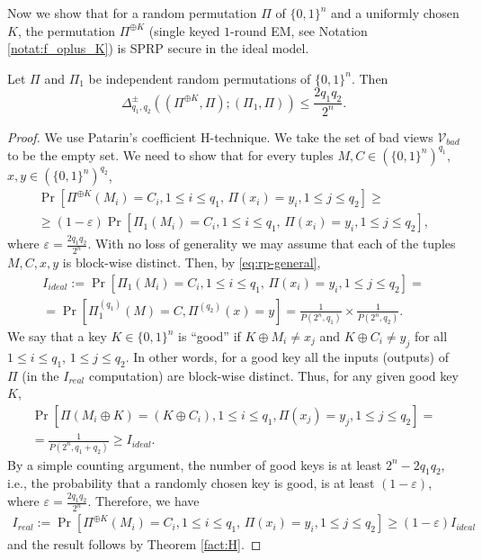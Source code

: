 \documentclass{llncs}
\newcommand{\s}{\{0,1\}}
\begin{document}
Now we show that for a random permutation $\Pi$ of $\s^n$ and a uniformly chosen $K$, the permutation $\Pi^{\oplus K}$ (single keyed $1$-round EM, see Notation \ref{notat:f_oplus_K}) is SPRP secure in the ideal model.
\begin{lemma}
\label{lemma2}
Let $\Pi$ and $\Pi_1$ be independent random permutations of $\s^n$. Then
\[\Delta^{\pm}_{q_1, q_2}\left((\Pi^{\oplus K}, \Pi);(\Pi_1, \Pi)\right) \leq  \frac{2q_1q_2}{2^n}.\]
\end{lemma}
\begin{proof} We use Patarin's coefficient H-technique. We take the set of bad views $\mathcal{V}_{bad}$ to be the empty set.
We need to show that for every tuples $M, C \in (\s^n)^{q_1}$, $x, y \in (\s^n)^{q_2}$,
\begin{gather*}
\Pr[\Pi^{\oplus K}(M_i) = C_i, 1 \leq i \leq q_1,\, \Pi(x_i) = y_i, 1 \leq j \leq q_2]\geq\\
\geq (1 - \varepsilon) \Pr[\Pi_1(M_i) = C_i, 1 \leq i \leq q_1,\, \Pi(x_i) = y_i, 1 \leq j \leq q_2],
\end{gather*}
where $\varepsilon=\frac{2q_1q_2}{2^n}$.
With no loss of generality we may assume that each of the tuples $M,C,x,y$ is block-wise distinct. Then, by \eqref{eq:rp-general},
\begin{gather*}I_{ideal} := \Pr[\Pi_1(M_i) = C_i, 1 \leq i \leq q_1,\, \Pi(x_i) = y_i, 1 \leq j \leq q_2]=\\
= \Pr[\Pi_1^{(q_1)}(M) = C, \Pi^{(q_2)}(x) = y] = \frac{1}{P(2^n, q_1)} \times \frac{1}{P(2^n, q_2)}.
\end{gather*}
We say that a key $K \in \s^n$ is ``good'' if $K \oplus M_i \neq x_j$  and $K \oplus C_i \neq y_j$ for all $1 \le i \le q_1$, $1 \le j \le q_2$. In other words, for a good key all the inputs (outputs) of $\Pi$ (in the $I_{real}$ computation) are block-wise distinct. Thus, for any given good key $K$,
\begin{gather*}
 \Pr[\Pi(M_i \oplus K) = (K \oplus C_i), 1 \leq i \leq q_1, \Pi(x_j) = y_j, 1 \leq j \leq q_2]=\\
= \frac{1}{P(2^n, q_1 + q_2)} \geq I_{ideal}.
\end{gather*}
By a simple counting argument, the number of good keys is at least $2^n - 2q_1q_2$, i.e., the probability that a randomly chosen key is good, is at least $(1 - \varepsilon)$, where $\varepsilon = \frac{2q_1q_2}{2^n}$. Therefore, we have
\begin{gather*}
I_{real}:= \Pr[\Pi^{\oplus K}(M_i) = C_i, 1 \leq i \leq q_1,\, \Pi(x_i) = y_i, 1 \leq j \leq q_2]\geq (1 - \varepsilon) I_{ideal}
\end{gather*}
and the result follows by Theorem \ref{fact:H}.
\end{proof}
\end{document}
